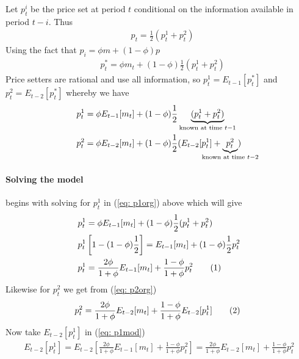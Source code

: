 \documentclass[12pt, a4paper]{article}
\begin{document}
\begin{spacing}{1.213}
Let $p_t^i$ be the price set at period $t$ conditional on the information available in period $t-i$. Thus 
\begin{align*}
&p_t = \frac{1}{2}(p_t^1 + p_t^2) 
\end{align*}
Using the fact that $p_i = \phi m + (1-\phi) p$ 
\begin{align*}
& p_t^* = \phi m_t + (1-\phi)\frac{1}{2}(p_t^1 + p_t^2)
\end{align*}
Price setters are rational and use all information, so $p_t^1 = E_{t-1}[p_t^*]$ and $p_t^2 = E_{t-2}[p_t^*]$ whereby we have
\begin{align}
&p_t^1 = \phi E_{t-1}[m_t] + (1-\phi) \frac{1}{2} \underbrace{(p_t^1 + p_t^2)}_{\textrm{known at time }t-1} \label{eq: p1org} \\
& p_t^2 = \phi E_{t-2}[m_t] + (1-\phi) \frac{1}{2} (E_{t-2}[p_t^1] +\underbrace{ p_t^2}_{\mathclap{\textrm{known at time }t-2}}) \label{eq: p2org}
\end{align}
\paragraph{Solving the model} begins with solving for $p_t^1$ in (\ref{eq: p1org}) above which will give 
\begin{align*}
&p_t^1 = \phi E_{t-1}[m_t] + (1-\phi) \frac{1}{2} (p_t^1 + p_t^2) \\
& p_t^1 \left[
1- (1-\phi)\frac{1}{2}
\right] = E_{t-1}[m_t] + (1-\phi) \frac{1}{2}  p_t^2 \\
& p_t^1 = \frac{2\phi}{1+\phi} E_{t-1}[m_t] + \frac{1-\phi}{1+\phi} p_t^2
  \stepcounter{equation}\tag{\theequation}\label{eq: p1mod}\ 
\end{align*}
Likewise for $p_t^2$ we get from (\ref{eq: p2org}) 
\begin{align*}
p_t^2 = \frac{2\phi}{1+\phi} E_{t-2}[m_t] + \frac{1-\phi}{1+\phi} E_{t-2}[p_t^1]   \stepcounter{equation}\tag{\theequation}\label{eq: p2mod}\ 
\end{align*}
Now take $E_{t-2}[p_t^1]$ in (\ref{eq: p1mod}) 
\begin{align*}
E_{t-2}[p_t^1] = E_{t-2}
\left[
\frac{2 \phi}{1+\phi} E_{t-1}[m_t] + \frac{1-\phi}{1+\phi} p_t^2
\right]
= \frac{2 \phi}{1+\phi} E_{t-2}[m_t] + \frac{1-\phi}{1+\phi} p_t^2
\end{align*}


\end{spacing}
\end{document}

